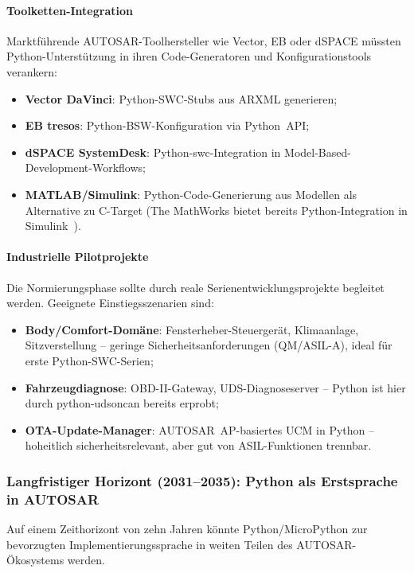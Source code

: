 ﻿\documentclass[12pt,a4paper,twoside]{article}
\begin{document}
\paragraph{Toolketten-Integration}
Marktführende AUTOSAR-Toolhersteller wie Vector, EB oder dSPACE müssten
Python-Unterstützung in ihren Code-Generatoren und Konfigurationstools verankern:
\begin{itemize}
  \item \textbf{Vector DaVinci}: Python-SWC-Stubs aus ARXML generieren;
  \item \textbf{EB tresos}: Python-BSW-Konfiguration via Python~API;
  \item \textbf{dSPACE SystemDesk}: Python-\gls{swc}-Integration in
        Model-Based-Development-Workflows;
  \item \textbf{MATLAB/Simulink}: Python-Code-Generierung aus Modellen
        als Alternative zu C-Target (The MathWorks bietet bereits
        Python-Integration in Simulink~\cite{ml_python_survey2023}).
\end{itemize}

\paragraph{Industrielle Pilotprojekte}
Die Normierungsphase sollte durch reale Serienentwicklungsprojekte
begleitet werden. Geeignete Einstiegsszenarien sind:
\begin{itemize}
  \item \textbf{Body/Comfort-Domäne}: Fensterheber-Steuergerät, Klimaanlage,
        Sitzverstellung -- geringe Sicherheitsanforderungen (QM/ASIL-A),
        ideal für erste Python-SWC-Serien;
  \item \textbf{Fahrzeugdiagnose}: OBD-II-Gateway, UDS-Diagnoseserver --
        Python ist hier durch python-udsoncan bereits erprobt;
  \item \textbf{OTA-Update-Manager}: AUTOSAR~AP-basiertes UCM in Python --
        hoheitlich sicherheitsrelevant, aber gut von ASIL-Funktionen
        trennbar.
\end{itemize}

\subsubsection{Langfristiger Horizont (2031--2035): Python als
  Erstsprache in AUTOSAR}

Auf einem Zeithorizont von zehn Jahren könnte Python/MicroPython
zur bevorzugten Implementierungssprache in weiten Teilen des
AUTOSAR-Ökosystems werden.
\end{document}
